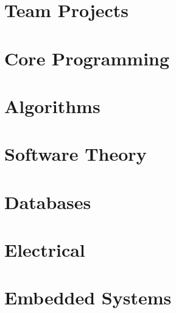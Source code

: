 \section{Team Projects}
\hypertarget{cat:team}{}











\section{Core Programming}
\hypertarget{cat:programming}{}




\section{Algorithms}
\hypertarget{cat:algo}{}



\section{Software Theory}
\hypertarget{cat:theory}{}



\section{Databases}
\hypertarget{cat:database}{}





\section{Electrical}
\hypertarget{cat:elec}{}


\section{Embedded Systems}
\hypertarget{cat:embedded}{}





